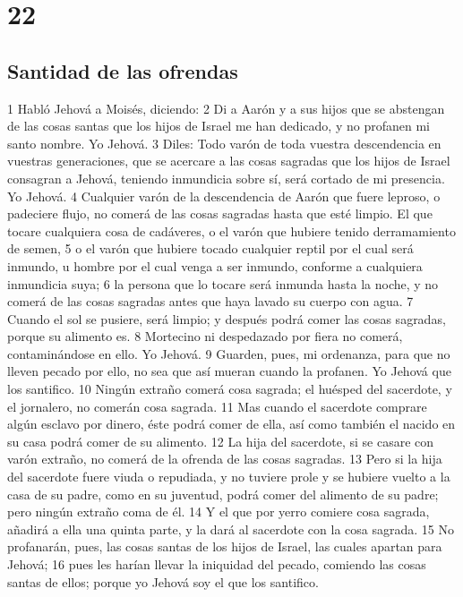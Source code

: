 \chapter{22}

\section*{Santidad de las ofrendas}

1 Habló Jehová a Moisés, diciendo:
2 Di a Aarón y a sus hijos que se abstengan de las cosas santas que los hijos de Israel me han dedicado, y no profanen mi santo nombre. Yo Jehová.
3 Diles: Todo varón de toda vuestra descendencia en vuestras generaciones, que se acercare a las cosas sagradas que los hijos de Israel consagran a Jehová, teniendo inmundicia sobre sí, será cortado de mi presencia. Yo Jehová.
4 Cualquier varón de la descendencia de Aarón que fuere leproso, o padeciere flujo, no comerá de las cosas sagradas hasta que esté limpio. El que tocare cualquiera cosa de cadáveres, o el varón que hubiere tenido derramamiento de semen,
5 o el varón que hubiere tocado cualquier reptil por el cual será inmundo, u hombre por el cual venga a ser inmundo, conforme a cualquiera inmundicia suya;
6 la persona que lo tocare será inmunda hasta la noche, y no comerá de las cosas sagradas antes que haya lavado su cuerpo con agua.
7 Cuando el sol se pusiere, será limpio; y después podrá comer las cosas sagradas, porque su alimento es.
8 Mortecino ni despedazado por fiera no comerá, contaminándose en ello. Yo Jehová.
9 Guarden, pues, mi ordenanza, para que no lleven pecado por ello, no sea que así mueran cuando la profanen. Yo Jehová que los santifico.
10 Ningún extraño comerá cosa sagrada; el huésped del sacerdote, y el jornalero, no comerán cosa sagrada.
11 Mas cuando el sacerdote comprare algún esclavo por dinero, éste podrá comer de ella, así como también el nacido en su casa podrá comer de su alimento.
12 La hija del sacerdote, si se casare con varón extraño, no comerá de la ofrenda de las cosas sagradas.
13 Pero si la hija del sacerdote fuere viuda o repudiada, y no tuviere prole y se hubiere vuelto a la casa de su padre, como en su juventud, podrá comer del alimento de su padre; pero ningún extraño coma de él.
14 Y el que por yerro comiere cosa sagrada, añadirá a ella una quinta parte, y la dará al sacerdote con la cosa sagrada.
15 No profanarán, pues, las cosas santas de los hijos de Israel, las cuales apartan para Jehová;
16 pues les harían llevar la iniquidad del pecado, comiendo las cosas santas de ellos; porque yo Jehová soy el que los santifico.
